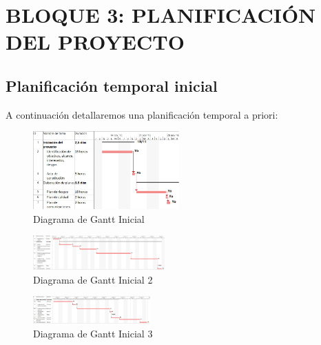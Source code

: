 \documentclass{pclass}
\begin{document}
\chapter{BLOQUE 3: PLANIFICACIÓN DEL PROYECTO}
\section{Planificación temporal inicial} 
A continuación detallaremos una planificación temporal a priori:

\begin{figure}[H]
  \centering
    \includegraphics[angle=270,width=0.5\textwidth]{img/ganttInicial}
  \caption{Diagrama de Gantt Inicial}
  \label{fig:ganttInicial}
\end{figure}

\begin{figure}[H]
	\centering
	\includegraphics[angle=270,width=0.45\textwidth]{img/ganttInicial_2}
	\caption{Diagrama de Gantt Inicial 2}
	\label{fig:ganttInicial2}
\end{figure}

\begin{figure}[H]
	\centering
	\includegraphics[angle=270,width=0.40\textwidth]{img/ganttInicial_3}
	\caption{Diagrama de Gantt Inicial 3}
	\label{fig:ganttInicial3}
\end{figure}
\end{document}
